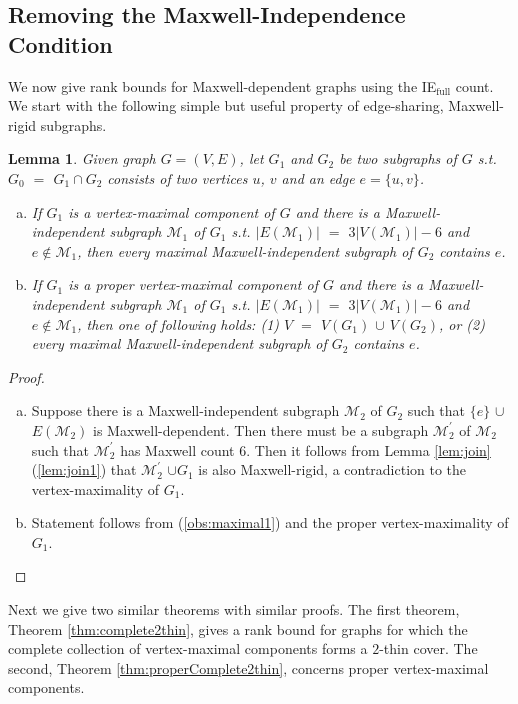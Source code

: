 \documentclass[10pt]{article}
\def\M{\mathcal {M}}
\newtheorem{lem}{Lemma}
\begin{document}
\subsection{Removing the Maxwell-Independence Condition}\label{sec:nonMaxwell}
We now give rank bounds for Maxwell-dependent graphs using the IE$_{\text{full}}$ count. We start with the following simple but useful property of edge-sharing, Maxwell-rigid subgraphs.

\begin{lem}\label{obs:maximal}
Given graph $G=(V, E)$, let $G_1$ and $G_2$ be two subgraphs of $G$ s.t. $G_0$ $=$ $G_1\cap G_2$ consists of two vertices $u$, $v$ and an edge $e=\{u, v\}$.
\begin{enumerate}[(a)]
\item\label{obs:maximal1} If $G_1$ is a vertex-maximal component of $G$ and there is a  Maxwell-independent subgraph $\M_1$ of $G_1$ s.t. $|E(\M_1)|$ $=$ $3|V(\M_1)|-6$ and $e\not\in \M_1$, then every maximal Maxwell-independent subgraph of $G_2$ contains $e$.
\item\label{obs:maximal2} If $G_1$ is a proper vertex-maximal component of $G$ and there is a  Maxwell-independent subgraph $\M_1$ of $G_1$ s.t. $|E(\M_1)|$ $=$ $3|V(\M_1)|-6$ and $e\not\in \M_1$, then one of following holds:
(1) $V$ $=$ $V(G_1)$ $\cup$ $V(G_2)$, or
(2) every maximal Maxwell-independent subgraph of $G_2$ contains $e$.
\end{enumerate}
\end{lem}
\begin{proof}
\begin{enumerate}[(a)]
\item Suppose there is a Maxwell-independent subgraph $\M_2$ of $G_2$
such that $\{e\}$ $\cup$ $E(\M_2)$ is Maxwell-dependent. Then there must be a subgraph $\M_2^{\prime}$ of $\M_2$ such that $\M_2^{\prime}$ has Maxwell count $6$. Then it follows from Lemma \ref{lem:join}(\ref{lem:join1}) that $\M_2^{\prime}$ $\cup G_1$ is also Maxwell-rigid, a contradiction to the vertex-maximality of $G_1$.
\item Statement follows from (\ref{obs:maximal1}) and the proper vertex-maximality of $G_1$. 
\end{enumerate}
\end{proof}

Next we give two similar theorems with similar proofs. The first theorem, Theorem \ref{thm:complete2thin}, gives a rank bound for graphs for which the complete collection of vertex-maximal components forms a $2$-thin cover. The second, Theorem \ref{thm:properComplete2thin}, concerns proper vertex-maximal components.
\end{document}
